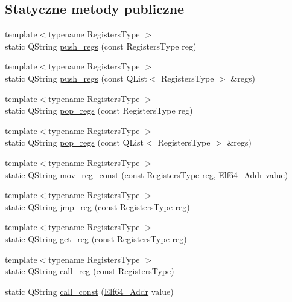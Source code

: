 \subsection*{Statyczne metody publiczne}
\begin{DoxyCompactItemize}
\item 
{\footnotesize template$<$typename Registers\-Type $>$ }\\static Q\-String \hyperlink{class_asm_code_generator_a76f8c73f9210eb61a8001c017c0cd4f1}{push\-\_\-regs} (const Registers\-Type reg)
\item 
{\footnotesize template$<$typename Registers\-Type $>$ }\\static Q\-String \hyperlink{class_asm_code_generator_a25ee0b50bb215502d9b61a753086f184}{push\-\_\-regs} (const Q\-List$<$ Registers\-Type $>$ \&regs)
\item 
{\footnotesize template$<$typename Registers\-Type $>$ }\\static Q\-String \hyperlink{class_asm_code_generator_a75bbaa5a9453e6997afdfa14e9471362}{pop\-\_\-regs} (const Registers\-Type reg)
\item 
{\footnotesize template$<$typename Registers\-Type $>$ }\\static Q\-String \hyperlink{class_asm_code_generator_aaed0677c22b8a46586286483ed11f205}{pop\-\_\-regs} (const Q\-List$<$ Registers\-Type $>$ \&regs)
\item 
{\footnotesize template$<$typename Registers\-Type $>$ }\\static Q\-String \hyperlink{class_asm_code_generator_a955d06de335abb5491727e690bb4cc85}{mov\-\_\-reg\-\_\-const} (const Registers\-Type reg, \hyperlink{elf_8h_aeed51d08e3a950d637f8ec1f0cd4ef65}{Elf64\-\_\-\-Addr} value)
\item 
{\footnotesize template$<$typename Registers\-Type $>$ }\\static Q\-String \hyperlink{class_asm_code_generator_ac196b01980e9de00bf6854baed99a1a2}{jmp\-\_\-reg} (const Registers\-Type reg)
\item 
{\footnotesize template$<$typename Registers\-Type $>$ }\\static Q\-String \hyperlink{class_asm_code_generator_ab578154f2a3d0ef023c8f6a302a3f565}{get\-\_\-reg} (const Registers\-Type reg)
\item 
{\footnotesize template$<$typename Registers\-Type $>$ }\\static Q\-String \hyperlink{class_asm_code_generator_a3bf9daed908df41eeec6031db9de2aae}{call\-\_\-reg} (const Registers\-Type)
\item 
static Q\-String \hyperlink{class_asm_code_generator_aa4989922344c4dc9ccfa937508915c3d}{call\-\_\-const} (\hyperlink{elf_8h_aeed51d08e3a950d637f8ec1f0cd4ef65}{Elf64\-\_\-\-Addr} value)
\end{DoxyCompactItemize}
